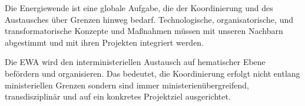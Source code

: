Die Energiewende ist eine globale Aufgabe, die der Koordinierung und des Austausches über Grenzen hinweg bedarf.
Technologische, organisatorische, und transformatorische Konzepte und Maßnahmen müssen mit unseren Nachbarn abgestimmt und mit ihren Projekten integriert werden.

Die EWA wird den interministeriellen Austausch auf hematischer Ebene befördern und organisieren. 
Das bedeutet, die Koordinierung erfolgt nicht entlang ministeriellen Grenzen sondern sind immer ministerienübergreifend, transdisziplinär und auf ein konkretes Projektziel ausgerichtet.

